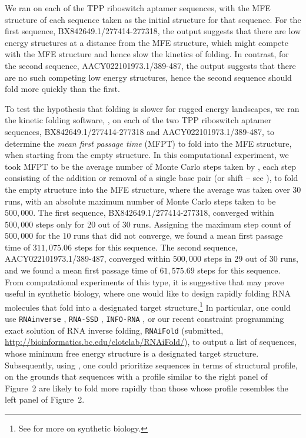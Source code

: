 We ran \fftbor on each of the TPP riboswitch aptamer
sequences, with the MFE structure of each
sequence taken as the initial structure \strSt for that sequence.  For the
first sequence, BX842649.1/277414-277318, the \fftbor output
suggests that there are low energy structures
at a distance from the MFE structure, which might compete with the MFE
structure and hence slow the kinetics of folding. In contrast, for the
second sequence, AACY022101973.1/389-487, the \fftbor output suggests
that there are no such competing low energy structures, hence
the second sequence should fold more quickly than the first.

To test the hypothesis that folding is slower for rugged energy landscapes,
we ran the kinetic folding software, \kinfold \cite{flamm},
on each of the two TPP riboswitch aptamer sequences,
BX842649.1/277414-277318 and AACY022101973.1/389-487,
to determine the {\em mean first passage time} (MFPT) to
fold into the MFE structure, when starting from the empty structure.
In this computational
experiment, we took MFPT to be the average number of Monte Carlo steps
taken by \kinfold, each step consisting of the addition or removal
of a single base pair (or shift -- see \cite{flamm}), to fold the
empty structure into the MFE
structure, where the average was taken over $30$ runs, with an absolute
maximum number of Monte Carlo steps taken to be $500,000$.
The first sequence, BX842649.1/277414-277318, converged within $500,000$
steps only for 20 out of 30 runs. Assigning the maximum step count of
$500,000$ for the 10 runs that did not converge, we found a mean first
passage time of $311,075.06$ steps for this sequence.
The second sequence, AACY022101973.1/389-487, converged within $500,000$
steps in 29 out of 30 runs, and we found a mean first passage time of
$61,575.69$ steps for this sequence. From computational experiments of this
type, it is suggestive that \fftbor may prove useful in synthetic
biology,
where one would like to design rapidly folding RNA molecules that
fold into a designated target structure.\footnote{See
\cite{Shetty.jbe08,Knight.msb05,Waldminghaus.bc08,Zadeh.jcc11} for more
on synthetic biology.} In particular, one could use
{\tt RNAinverse} \cite{hofacker:ViennaWebServer},
{\tt RNA-SSD} \cite{Andronescu04},
{\tt INFO-RNA} \cite{Busch06},
or our recent constraint programming exact
solution of RNA inverse folding, {\tt RNAiFold}
(submitted, \url{http://bioinformatics.bc.edu/clotelab/RNAiFold/}),
to output a list of sequences,
whose minimum free energy structure is a designated target structure.
Subsequently, using \fftbor, one could prioritize sequences in terms
of \fftbor structural profile, on the grounds that sequences with a profile
similar to the right panel of Figure~2
are likely to fold more rapidly than those whose profile resembles
the left panel of Figure~2.

